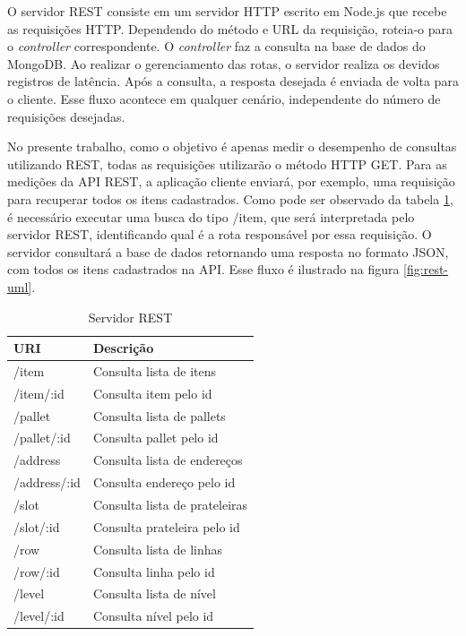 O servidor REST consiste em um servidor HTTP escrito em Node.js que recebe as requisições HTTP. Dependendo do método e URL da requisição, roteia-o para o \textit{controller} correspondente. O \textit{controller} faz a consulta na base de dados do MongoDB. Ao realizar o gerenciamento das rotas, o servidor realiza os devidos registros de latência. Após a consulta, a resposta desejada é enviada de volta para o cliente. Esse fluxo acontece em qualquer cenário, independente do número de requisições desejadas.

No presente trabalho, como o objetivo é apenas medir o desempenho de consultas utilizando REST, todas as requisições utilizarão o método HTTP GET. Para as medições da API REST, a aplicação cliente enviará, por exemplo, uma requisição para recuperar todos os itens cadastrados. Como pode ser observado da tabela \ref{tab:rest-url}, é necessário executar uma busca do tipo \textup{/item}, que será interpretada pelo servidor REST, identificando qual é a rota responsável por essa requisição. O servidor consultará a base de dados retornando uma resposta no formato JSON, com todos os itens cadastrados na API. Esse fluxo é ilustrado na figura \ref{fig:rest-uml}.

\begin{table}[htbp]
    \centering
    \begin{tabular}{| l | l |}
        \hline
        \textbf{URI} & \textbf{Descrição} \\ \hline
        /item & Consulta lista de itens \\ \hline
        /item/:id & Consulta item pelo id \\ \hline
        /pallet & Consulta lista de pallets  \\ \hline
        /pallet/:id & Consulta pallet pelo id  \\ \hline
        /address & Consulta lista de endereços \\ \hline
        /address/:id & Consulta endereço pelo id \\ \hline
        /slot & Consulta lista de prateleiras \\ \hline
        /slot/:id & Consulta prateleira pelo id \\ \hline
        /row & Consulta lista de linhas \\ \hline
        /row/:id & Consulta linha pelo id \\ \hline
        /level & Consulta lista de nível \\ \hline
        /level/:id & Consulta nível pelo id \\ \hline
    \end{tabular}
    \caption{Servidor REST} \label{tab:rest-url}
\end{table}

